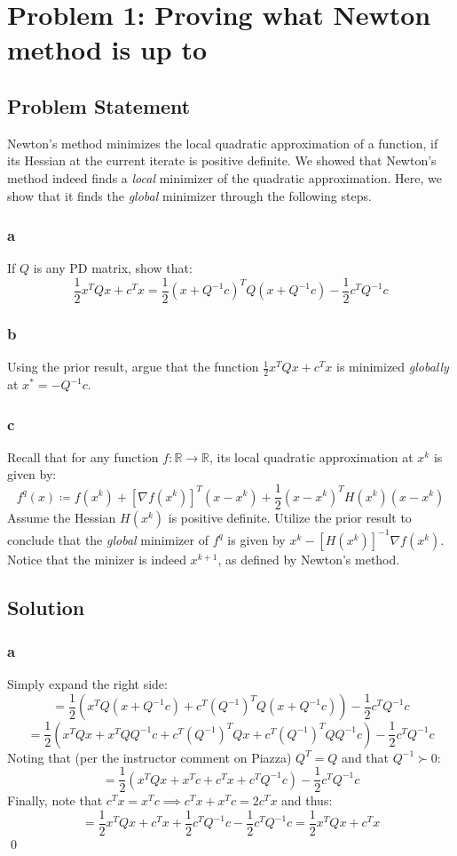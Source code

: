 \documentclass[11pt]{report}
\theoremstyle{definition}
\begin{document}
\section*{Problem 1: Proving what Newton method is up to}
\subsection*{Problem Statement}
Newton's method minimizes the local quadratic approximation of a function, if
its Hessian at the current iterate is positive definite. We showed that Newton's
method indeed finds a \textit{local} minimizer of the quadratic approximation.
Here, we show that it finds the \textit{global} minimizer through the following
steps.

\subsubsection*{a}
If $Q$ is any PD matrix, show that:
\[ \frac{1}{2}x^TQx+c^Tx =  \frac{1}{2}(x+Q^{-1}c)^TQ(x+Q^{-1}c)-\frac{1}{2}c^TQ^{-1}c \]

\subsubsection*{b}
Using the prior result, argue that the function $\frac{1}{2}x^TQx+c^Tx$ is
minimized \textit{globally} at $x^*=-Q^{-1}c$.

\subsubsection*{c}
Recall that for any function $f:\mathbb{R}\rightarrow\mathbb{R}$, its local quadratic
approximation at $x^k$ is given by:
\[
	f^{q}(x) \coloneqq
	f(x^k)+[\nabla f(x^k)]^T(x-x^k)+\frac{1}{2}(x-x^k)^TH(x^k)(x-x^k)
\]
Assume the Hessian $H(x^k)$ is positive definite. Utilize the prior result to
conclude that the \textit{global} minimizer of $f^q$ is given by
$x^k-[H(x^k)]^{-1}\nabla f(x^k)$. Notice that the minizer is indeed $x^{k+1}$,
as defined by Newton's method.


\subsection*{Solution}
\subsubsection*{a}
Simply expand the right side:
\[
	=\frac{1}{2}(x^TQ(x+Q^{-1}c)+c^T(Q^{-1})^TQ(x+Q^{-1}c))-\frac{1}{2}c^TQ^{-1}c
\]
\[
	=\frac{1}{2}(x^TQx+x^TQQ^{-1}c+c^T(Q^{-1})^TQx+c^T(Q^{-1})^TQQ^{-1}c)-\frac{1}{2}c^TQ^{-1}c
\]
Noting that (per the instructor comment on Piazza) $Q^T=Q$ and that $Q^{-1}\succ0$:
\[ =\frac{1}{2}(x^TQx+x^Tc+c^Tx+c^TQ^{-1}c)-\frac{1}{2}c^TQ^{-1}c \]
Finally, note that $c^Tx = x^Tc \implies c^Tx+x^Tc=2c^Tx$ and thus:
\[
	=\frac{1}{2}x^TQx+c^Tx+\frac{1}{2}c^TQ^{-1}c-\frac{1}{2}c^TQ^{-1}c
	=\frac{1}{2}x^TQx+c^Tx
\]
\qed
\end{document}
